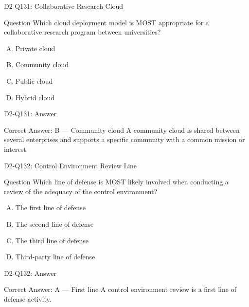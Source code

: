\documentclass{beamer}
\begin{document}
	\begin{frame}{D2-Q131: Collaborative Research Cloud}
		\begin{block}{Question}
			Which cloud deployment model is MOST appropriate for a collaborative research program between universities?
		\end{block}
		\begin{enumerate}[(A)]
			\item Private cloud
			\item Community cloud
			\item Public cloud
			\item Hybrid cloud
		\end{enumerate}
	\end{frame}
	\begin{frame}{D2-Q131: Answer}
		\begin{block}{Correct Answer: B --- Community cloud}
			A community cloud is shared between several enterprises and supports a specific community with a common mission or interest.
		\end{block}
	\end{frame}
	
	\begin{frame}{D2-Q132: Control Environment Review Line}
		\begin{block}{Question}
			Which line of defense is MOST likely involved when conducting a review of the adequacy of the control environment?
		\end{block}
		\begin{enumerate}[(A)]
			\item The first line of defense
			\item The second line of defense
			\item The third line of defense
			\item Third-party line of defense
		\end{enumerate}
	\end{frame}
	\begin{frame}{D2-Q132: Answer}
		\begin{block}{Correct Answer: A --- First line}
			A control environment review is a first line of defense activity.
		\end{block}
	\end{frame}
	
\end{document}
